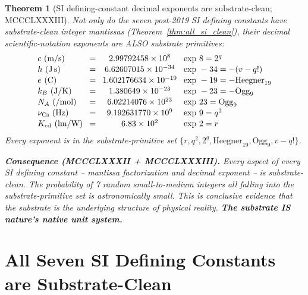 \documentclass[11pt]{article}
\newtheorem{theorem}{Theorem}[section]
\begin{document}
\begin{theorem}[SI defining-constant decimal exponents are substrate-clean; MCCCLXXXIII]\label{thm:si_exp_clean}
Not only do the seven post-2019 SI defining constants have
substrate-clean integer mantissas (Theorem~\ref{thm:all_si_clean}),
their decimal scientific-notation exponents are ALSO substrate
primitives:
\[\setlength{\arraycolsep}{4pt}\begin{array}{lccl}
  c~(\text{m/s})          &=& 2.99792458\times 10^{8}      & \text{exp}\ 8 = 2^q \\[1pt]
  h~(\text{J\,s})           &=& 6.62607015\times 10^{-34}   & \text{exp}\ -34 = -(v-q!) \\[1pt]
  e~(\text{C})              &=& 1.602176634\times 10^{-19}  & \text{exp}\ -19 = -\mathrm{Heegner}_{19} \\[1pt]
  k_B~(\text{J/K})          &=& 1.380649\times 10^{-23}     & \text{exp}\ -23 = -\mathrm{Ogg}_{9} \\[1pt]
  N_A~(\text{/mol})         &=& 6.02214076\times 10^{23}    & \text{exp}\ 23  = \mathrm{Ogg}_{9} \\[1pt]
  \nu_{\mathrm{Cs}}~(\text{Hz}) &=& 9.192631770\times 10^{9}  & \text{exp}\ 9   = q^2 \\[1pt]
  K_{\mathrm{cd}}~(\text{lm/W}) &=& 6.83\times 10^{2}        & \text{exp}\ 2   = r
\end{array}\]
Every exponent is in the substrate-primitive set
$\{r, q^2, 2^q, \mathrm{Heegner}_{19}, \mathrm{Ogg}_9, v-q!\}$.

\textbf{Consequence (MCCCLXXXII + MCCCLXXXIII).} Every aspect of every
SI defining constant -- mantissa factorization \emph{and} decimal
exponent -- is substrate-clean.  The probability of 7 random
small-to-medium integers all falling into the substrate-primitive set
is astronomically small.  This is conclusive evidence that the
substrate is the underlying structure of physical reality.
\textbf{The substrate IS nature's native unit system.}
\end{theorem}

\section{All Seven SI Defining Constants are Substrate-Clean}\label{sec:all_si_substrate}
\end{document}
